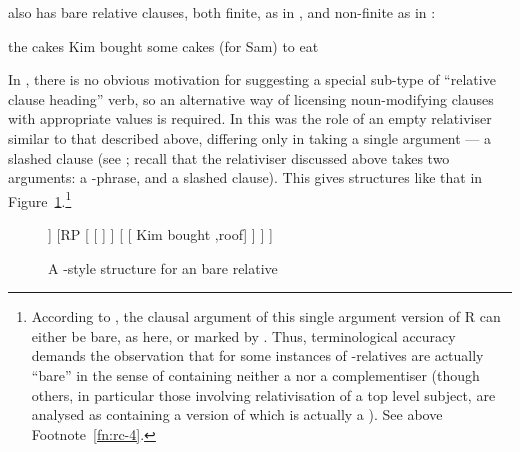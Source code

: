 \documentclass[output=paper,nonflat,draftmode]{./langsci/langscibook}
\begin{document}
 also has bare relative clauses, both finite, as in , and non-finite
as in :
\begin{exe}\ex\begin{xlist}\label{x:rc-88}
  \ex\label{x:rc-89} the cakes Kim bought \uGap
  \ex\label{x:rc-90} some cakes (for Sam) to eat \uGap
\end{xlist}\end{exe}
In , there is no obvious motivation for suggesting a special sub-type of ``relative
clause heading'' verb, so an alternative way of licensing noun-modifying clauses with
appropriate  values is required. In \cite{Pollard:Sag:94} this was the role
of an empty relativiser similar to that described above, differing only in taking a single
argument --- a slashed clause (see \citealt[222]{Pollard:Sag:94}; recall that the
relativiser discussed above takes two arguments: a -phrase, and a slashed
clause). This gives structures like that in Figure~\ref{fig:rc-7}.\footnote{According to
  \cite[222]{Pollard:Sag:94}, the clausal argument of this single argument version of R
  can either be bare, as here, or marked by . Thus, terminological accuracy
  demands the observation that for \citeauthor{Pollard:Sag:94} some instances of
  -relatives are actually ``bare'' in the sense of containing neither a  nor a complementiser (though others, in particular those involving
  relativisation of a top level subject, are analysed as containing a version of
   which is actually a ). See above Footnote~\ref{fn:rc-4}.}
\begin{figure}
    \begin{forest}  %
   [{\ibar{N}\subtag{1}} , baseline
      [{\idx{7}\ibar{N}\subtag{1}}  [ {cakes} ]  
      ]
      [{RP} 
            [{}     [ {\trace} ] ]
            [{}  [ {Kim bought} ,roof] ]
      ]
   ]
   \end{forest}
   \caption{A \cite{Pollard:Sag:94}-style structure for an  bare relative}
   \label{fig:rc-7}
\end{figure}
\end{document}
